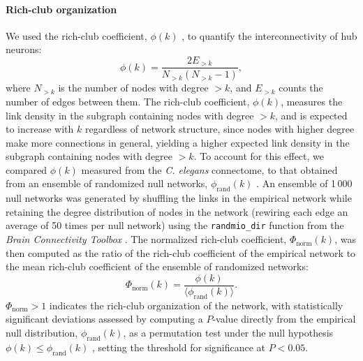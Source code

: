 \documentclass[10pt,letterpaper]{article}
\begin{document}
\paragraph{Rich-club organization}
We used the rich-club coefficient, $\phi(k)$ \cite{Colizza:2006kz}, to quantify the interconnectivity of hub neurons:
\begin{equation}
    \label{eqn:rich_club}
    \phi(k) = \frac{2E_{>k}}{N_{>k}(N_{>k}-1)},
\end{equation}
where $N_{>k}$ is the number of nodes with degree $>k$, and $E_{>k}$ counts the number of edges between them.
The rich-club coefficient, $\phi(k)$, measures the link density in the subgraph containing nodes with degree $>k$, and is expected to increase with $k$ regardless of network structure, since nodes with higher degree make more connections in general, yielding a higher expected link density in the subgraph containing nodes with degree $>k$.
To account for this effect, we compared $\phi(k)$ measured from the \emph{C. elegans} connectome, to that obtained from an ensemble of randomized null networks, $\phi_\mathrm{rand}(k)$ \cite{Colizza:2006kz}.
An ensemble of 1\,000 null networks was generated by shuffling the links in the empirical network while retaining the degree distribution of nodes in the network \cite{Maslov:2002hi} (rewiring each edge an average of 50 times per null network) using the \texttt{randmio\_dir} function from the {\it Brain Connectivity Toolbox} \cite{Rubinov:2010jd}.
The normalized rich-club coefficient, $\Phi_\mathrm{norm}(k)$, was then computed as the ratio of the rich-club coefficient of the empirical network to the mean rich-club coefficient of the ensemble of randomized networks:
\begin{equation}
    \label{eqn:rich_club_norm}
    \Phi_\mathrm{norm}(k) = \frac{\phi(k)}{\langle \phi_\mathrm{rand}(k) \rangle}.
\end{equation}
$\Phi_\mathrm{norm} > 1$ indicates the rich-club organization of the network, with statistically significant deviations assessed by computing a $P$-value directly from the empirical null distribution, $\phi_\mathrm{rand}(k)$, as a permutation test under the null hypothesis $\phi(k) \leq \phi_\mathrm{rand}(k)$ \cite{vandenHeuvel:2011he}, setting the threshold for significance at $P < 0.05$.

\end{document}

